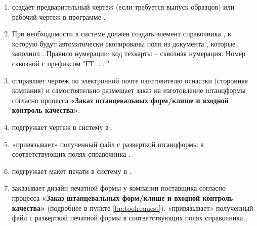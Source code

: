 \begin{enumerate}
\item \tehnolog создает предварительный чертеж (если требуется выпуск образцов) или рабочий чертеж в программе \blue{\@AutoCad}.
\item	При необходимости \tehnolog в системе \gofro должен создать элемент справочника , в которую будут автоматически скопированы поля из документа , которые заполнил \manager. Правило нумерации: код техкарты – сквозная нумерация. Номер сквозной с префиксом "ГТ. . . "


\item \tehnolog 
отправляет чертеж по электронной почте изготовителю оснастки (сторонняя компания) и самостоятельно размещает заказ на изготовление штанцформы согласно процесса \textbf{«Заказ штанцевальных форм/клише и входной контроль качества»}. 

\item \tehnolog подгружает чертеж в систему \gofro в .

\item \tehnolog «привязывает» полученный файл с разверткой штанцформы в соответствующих полях справочника .


\item \tehnolog подгружает макет печати в систему \gofro в .

\item	\tehnolog заказывает дизайн печатной формы у компании поставщика согласно процесса \textbf{«Заказ штанцевальных форм/клише и входной контроль качества»} (подробнее в пункте \ref{bp:toolrequest}). \tehnolog «привязывает» полученный файл с разверткой печатной формы в соответствующих полях справочника . 





\end{enumerate}

